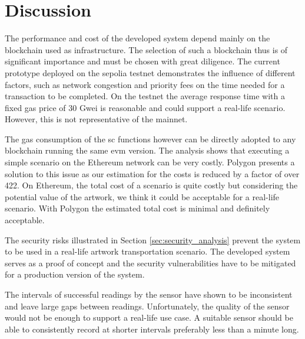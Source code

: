 \section{Discussion}
\label{sec:eval_discussion}
The performance and cost of the developed system depend mainly on the blockchain used as infrastructure. The selection of such a blockchain thus is of significant importance and must be chosen with great diligence. The current prototype deployed on the sepolia testnet demonstrates the influence of different factors, such as network congestion and priority fees on the time needed for a transaction to be completed. On the testnet the average response time with a fixed gas price of 30 Gwei is reasonable and could support a real-life scenario. However, this is not representative of the mainnet.

The gas consumption of the \gls{sc} functions however can be directly adopted to any blockchain running the same \gls{evm} version. The analysis shows that executing a simple scenario on the Ethereum network can be very costly. Polygon presents a solution to this issue as our estimation for the costs is reduced by a factor of over 422. On Ethereum, the total cost of a scenario is quite costly but considering the potential value of the artwork, we think it could be acceptable for a real-life scenario. With Polygon the estimated total cost is minimal and definitely acceptable.

The security risks illustrated in Section \ref{sec:security_analysis} prevent the system to be used in a real-life artwork transportation scenario. The developed system serves as a proof of concept and the security vulnerabilities have to be mitigated for a production version of the system.

The intervals of successful readings by the sensor have shown to be inconsistent and leave large gaps between readings. Unfortunately, the quality of the sensor would not be enough to support a real-life use case. A suitable sensor should be able to consistently record at shorter intervals preferably less than a minute long.

